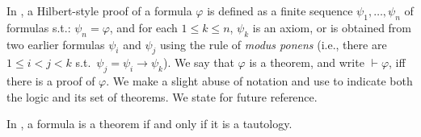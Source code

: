 



In \DAL, a Hilbert-style proof of a formula $\varphi$ is defined as a finite sequence $\psi_1, \dots, \psi_n$ of formulas s.t.: $\psi_n = \varphi$, and for each $1 \leq k \leq n$, $\psi_k$ is an axiom, or is obtained from two earlier formulas $\psi_i$ and $\psi_j$ using the rule of \emph{modus ponens} (i.e., there are $1 \leq i < j < k$ s.t.\ $\psi_j = {\psi_i \to \psi_k}$).
We say that $\varphi$ is a theorem, and write $\vdash \varphi$, iff there is a proof of $\varphi$.
We make a slight abuse of notation and use \DAL to indicate both the logic and its set of theorems.
We state  for future reference.

\medskip
\begin{theorem}\label{th:segerber:completeness}
	In \DAL, a formula is a theorem if and only if it is a tautology.
\end{theorem}
